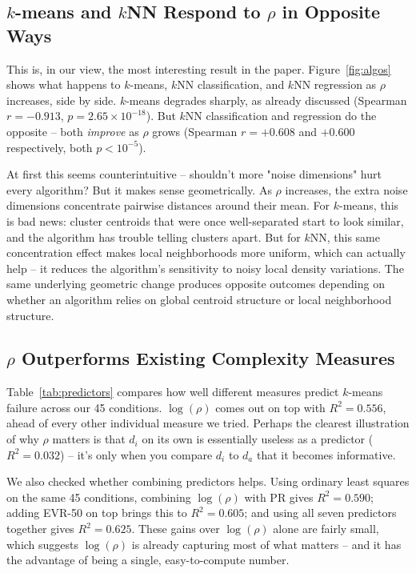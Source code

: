 \documentclass[pdflatex,sn-mathphys-num]{sn-jnl}
\theoremstyle{thmstyleone}
\begin{document}
\subsection{$k$-means and $k$NN Respond to $\rho$ in Opposite Ways}

This is, in our view, the most interesting result in the paper. Figure~\ref{fig:algos}
shows what happens to $k$-means, $k$NN classification, and $k$NN regression as
$\rho$ increases, side by side. $k$-means degrades sharply, as already
discussed (Spearman $r = -0.913$, $p = 2.65 \times 10^{-18}$). But $k$NN
classification and regression do the opposite -- both \textit{improve} as
$\rho$ grows (Spearman $r = +0.608$ and $+0.600$ respectively, both
$p < 10^{-5}$).

At first this seems counterintuitive -- shouldn't more "noise dimensions" hurt
every algorithm? But it makes sense geometrically. As $\rho$ increases, the
extra noise dimensions concentrate pairwise distances around their mean. For
$k$-means, this is bad news: cluster centroids that were once well-separated
start to look similar, and the algorithm has trouble telling clusters apart.
But for $k$NN, this same concentration effect makes local neighborhoods more
uniform, which can actually help -- it reduces the algorithm's sensitivity to
noisy local density variations. The same underlying geometric change produces
opposite outcomes depending on whether an algorithm relies on global centroid
structure or local neighborhood structure.

\subsection{$\rho$ Outperforms Existing Complexity Measures}

Table~\ref{tab:predictors} compares how well different measures predict
$k$-means failure across our 45 conditions. $\log(\rho)$ comes out on top with
$R^2=0.556$, ahead of every other individual measure we tried. Perhaps the
clearest illustration of why $\rho$ matters is that $d_i$ on its own is
essentially useless as a predictor ($R^2=0.032$) -- it's only when you compare
$d_i$ to $d_a$ that it becomes informative.

We also checked whether combining predictors helps. Using ordinary least
squares on the same 45 conditions, combining $\log(\rho)$ with PR gives
$R^2=0.590$; adding EVR-50 on top brings this to $R^2=0.605$; and using all
seven predictors together gives $R^2=0.625$. These gains over $\log(\rho)$
alone are fairly small, which suggests $\log(\rho)$ is already capturing most
of what matters -- and it has the advantage of being a single, easy-to-compute
number.
\end{document}
